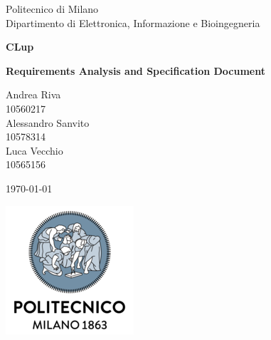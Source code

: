 \documentclass[10pt,english, openany]{book}
\begin{document}

\begin{titlepage}
	\clearpage\thispagestyle{empty}
	\centering
	\vspace{1cm}

	{\normalsize Politecnico di Milano\\
	             Dipartimento di Elettronica, Informazione e Bioingegneria \par}
		\vspace{2cm}
	{\Huge \textbf{CLup}
	} \\
	{\large \textbf{Requirements Analysis and Specification Document} \par}
	\vspace{4cm}
	{\normalsize Andrea Riva\\
	             10560217\\
	             Alessandro Sanvito\\ 
                 10578314\\
                 Luca Vecchio\\
                 10565156
                 \par}
	\vspace{5cm}
	
	{\normalsize \today \par}
	
	\vspace{0.5cm}
    
    \centering \includegraphics[scale=0.6]{logo1.png}
    
    
	\pagebreak

\end{titlepage}

\tableofcontents{}

\mainmatter
\end{document}
